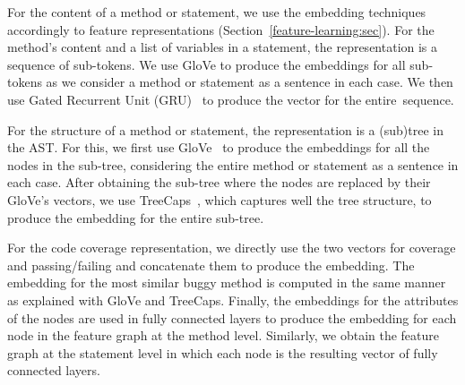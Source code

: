 For the content of a method or statement, we use the
embedding techniques accordingly to feature representations
(Section~\ref{feature-learning:sec}). For the method's content and a
list of variables in a statement, the representation is a sequence of
sub-tokens. We use GloVe \cite{glove2014} to produce the embeddings
for all sub-tokens as we consider a method or statement as a sentence
in each case. We then use Gated Recurrent Unit (GRU)~\cite{GRU-cho14}
to produce the vector for the entire~sequence.

For the structure of a method or statement, the representation is a
(sub)tree in the AST. For this, we first use GloVe~\cite{glove2014} to
produce the embeddings for all the nodes in the sub-tree, considering
the entire method or statement as a sentence in each case. After
obtaining the sub-tree where the nodes are replaced by their GloVe's
vectors, we use TreeCaps~\cite{bui2021treecaps}, which captures well
the tree structure, to produce the embedding for the entire sub-tree.

For the code coverage representation, we directly use the two vectors
for coverage and passing/failing and concatenate them to produce the
embedding. The embedding for the most similar buggy method is computed
in the same manner as explained with GloVe and TreeCaps. Finally, the
embeddings for the attributes of the nodes are used in fully connected
layers to produce the embedding for each node in the feature graph at
the method level. Similarly, we obtain the feature graph at the
statement level in which each node is the resulting vector of fully
connected layers.


